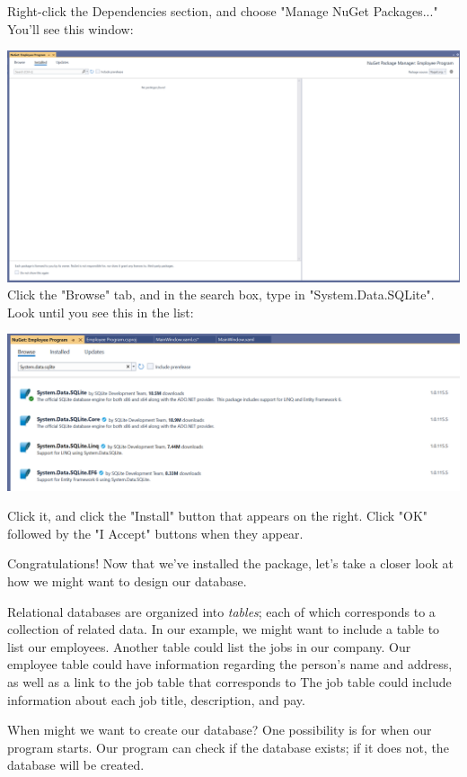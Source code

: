 \documentclass[oneside, openany] {book}
\begin{document}
Right-click the Dependencies section, and choose "Manage NuGet Packages..."
You'll see this window:

\includegraphics[scale=0.13]{nuget}
Click the "Browse" tab, and in the search box, type in "System.Data.SQLite". Look until you see this in the list:

\includegraphics[scale=0.206]{sqliteinstall}

Click it, and click the "Install" button that appears on the right. Click "OK" followed by the "I Accept" buttons when they appear.

Congratulations! Now that we've installed the package, let's take a closer look at how we might want to design our database.

Relational databases are organized into \emph{tables}; each of which corresponds to a collection of related data. In our example, we might want to include a table to list our employees. Another table could list the jobs in our company. Our employee table could have information regarding the person's name and address, as well as a link to the job table that corresponds to The job table could include information about each job title, description, and pay.

When might we want to create our database? One possibility is for when our program starts. Our program can check if the database exists; if it does not, the database will be created.
\end{document}
